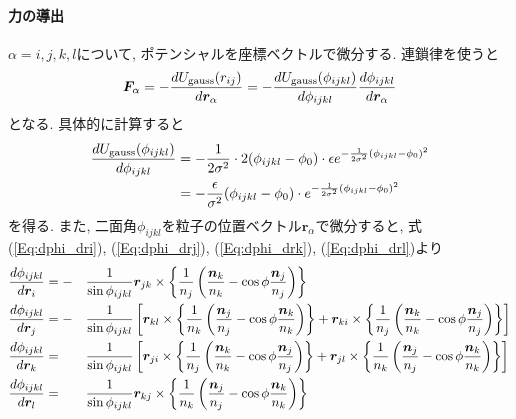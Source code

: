 \paragraph{力の導出}
$\alpha = i, j, k, l$について, ポテンシャルを座標ベクトルで微分する. 連鎖律を使うと
\begin{equation}
   \bm{F}_{\alpha}
   =
   -
   \frac{d U_{\mathrm{gauss}}(r_{ij})}{d \bm{r}_{\alpha}}
   =
   -
   \frac{d U_{\mathrm{gauss}}(\phi_{ijkl})}{d \phi_{ijkl}}
   \frac{d \phi_{ijkl}}{d \bm{r}_{\alpha}}
   \notag
\end{equation}
となる. 具体的に計算すると
\begin{align}
   \frac{d U_{\mathrm{gauss}}(\phi_{ijkl})}{d \phi_{ijkl}}
   &=
   -
   \frac{1}{2\sigma^{2}}
   \cdot 2
   (\phi_{ijkl} - \phi_{0})
   \cdot
   \epsilon
   e^{-\frac{1}{2\sigma^{2}}(\phi_{ijkl} - \phi_{0})^{2}}
   \notag
   \\
   &=
   -
   \frac{\epsilon}{\sigma^{2}}
   (\phi_{ijkl} - \phi_{0})
   \cdot
   e^{-\frac{1}{2\sigma^{2}}(\phi_{ijkl} - \phi_{0})^{2}}
   \notag
\end{align}
を得る. また, 二面角$\phi_{ijkl}$を粒子の位置ベクトル$\bm{r}_{\alpha}$で微分すると,
式(\ref{Eq:dphi_dri}), (\ref{Eq:dphi_drj}), (\ref{Eq:dphi_drk}), (\ref{Eq:dphi_drl})より
\begin{alignat}{4}
   \frac{d \phi_{ijkl}}{d \bm{r}_{i}}
   &=
   -&&
   \frac{1}{\sin \phi_{ijkl}}
   \bm{r}_{jk} \times
   \left\{
          \frac{1}{n_{j}}
          \left(
                 \frac{\bm{n}_{k}}{n_{k}} - \cos\phi \frac{\bm{n}_{j}}{n_{j}}
          \right)
   \right\}
   \notag
   \\
   \frac{d \phi_{ijkl}}{d \bm{r}_{j}}
   &=
   -&&
   \frac{1}{\sin \phi_{ijkl}}
   \left[
      \bm{r}_{kl} \times
      \left\{
             \frac{1}{n_{k}}
             \left(
                    \frac{\bm{n}_{j}}{n_{j}} - \cos\phi \frac{\bm{n}_{k}}{n_{k}}
             \right)
      \right\}
    +
      \bm{r}_{ki} \times
      \left\{
             \frac{1}{n_{j}}
             \left(
                    \frac{\bm{n}_{k}}{n_{k}} - \cos\phi \frac{\bm{n}_{j}}{n_{j}}
             \right)
      \right\}
   \right]
   \notag
   \\
   \frac{d \phi_{ijkl}}{d \bm{r}_{k}}
   &=&&
   \frac{1}{\sin \phi_{ijkl}}
   \left[
      \bm{r}_{ji} \times
      \left\{
             \frac{1}{n_{j}}
             \left(
                    \frac{\bm{n}_{k}}{n_{k}} - \cos\phi \frac{\bm{n}_{j}}{n_{j}}
             \right)
      \right\}
    +
      \bm{r}_{jl} \times
      \left\{
             \frac{1}{n_{k}}
             \left(
                    \frac{\bm{n}_{j}}{n_{j}} - \cos\phi \frac{\bm{n}_{k}}{n_{k}}
             \right)
      \right\}
   \right]
   \notag
   \\
   \frac{d \phi_{ijkl}}{d \bm{r}_{l}}
   &=&&
   \frac{1}{\sin \phi_{ijkl}}
   \bm{r}_{kj} \times
   \left\{
          \frac{1}{n_{k}}
          \left(
                 \frac{\bm{n}_{j}}{n_{j}} - \cos\phi \frac{\bm{n}_{k}}{n_{k}}
          \right)
   \right\}
   \notag
\end{alignat}
